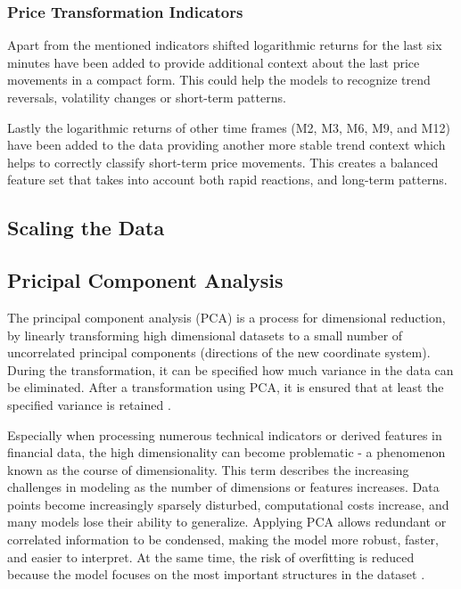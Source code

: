 \subsubsection{Price Transformation Indicators}

Apart from the mentioned indicators shifted logarithmic returns for the last six minutes have been added to provide additional context about the last price movements in a compact form. This could help the models to recognize trend reversals, volatility changes or short-term patterns.

Lastly the logarithmic returns of other time frames (M2, M3, M6, M9, and M12) have been added to the data providing another more stable trend context which helps to correctly classify short-term price movements. This creates a balanced feature set that takes into account both rapid reactions, and long-term patterns.

\subsection{Scaling the Data}

\subsection{Pricipal Component Analysis}

The principal component analysis (PCA) is a process for dimensional reduction, by linearly transforming high dimensional datasets to a small number of uncorrelated principal components  (directions of the new coordinate system). During the transformation, it can be specified how much variance in the data can be eliminated. After a transformation using PCA, it is ensured that at least the specified variance is retained \cite{wikipedia-pca}.

Especially when processing numerous technical indicators or derived features in financial data, the high dimensionality can become problematic - a phenomenon known as the course of dimensionality. This term describes the increasing challenges in modeling as the number of dimensions or features increases. Data points become increasingly sparsely disturbed, computational costs increase, and many models lose their ability to generalize. Applying PCA allows redundant or correlated information to be condensed, making the model more robust, faster, and easier to interpret. At the same time, the risk of overfitting is reduced because the model focuses on the most important structures in the dataset \cite{wikipedia-curse-od-dimensionality}.

